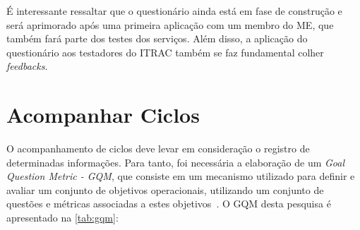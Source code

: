É interessante ressaltar que o questionário ainda está em fase de construção e será aprimorado após uma primeira aplicação com um membro do ME, que também fará parte dos testes dos serviços. Além disso, a aplicação do questionário aos testadores do ITRAC também se faz fundamental colher \textit{feedbacks}.

\section{Acompanhar Ciclos}
\label{sec:acompanhar_ciclos}

O acompanhamento de ciclos deve levar em consideração o registro de determinadas informações. Para tanto, foi necessária a elaboração de um \textit{Goal Question Metric - GQM}, que consiste em um mecanismo utilizado para definir e avaliar um conjunto de objetivos operacionais, utilizando um conjunto de questões e métricas associadas a estes objetivos~\cite{basili1994goal}. O GQM desta pesquisa é apresentado na \ref{tab:gqm}:


